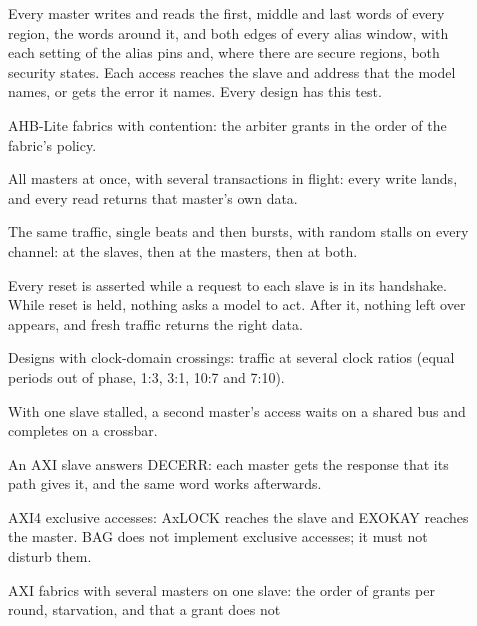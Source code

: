\begin{description}
\item[] Every master writes and reads the
  first, middle and last words of every region, the words around it, and both edges of
  every alias window, with each setting of the alias pins and, where there are secure
  regions, both security states. Each access reaches the slave and address that the
  model names, or gets the error it names. Every design has this test.
\item[] AHB-Lite fabrics with contention: the
  arbiter grants in the order of the fabric's policy.
\item[] All masters at once, with
  several transactions in flight: every write lands, and every read returns that
  master's own data.
\item[] The same traffic, single
  beats and then bursts, with random stalls on every channel: at the slaves, then at the
  masters, then at both.
\item[] Every reset is asserted while a
  request to each slave is in its handshake. While reset is held, nothing asks a model
  to act. After it, nothing left over appears, and fresh traffic returns the right data.
\item[] Designs with clock-domain
  crossings: traffic at several clock ratios (equal periods out of phase, 1:3, 3:1, 10:7
  and 7:10).
\item[] With one
  slave stalled, a second master's access waits on a shared bus and completes on a
  crossbar.
\item[] An AXI slave answers DECERR: each
  master gets the response that its path gives it, and the same word works afterwards.
\item[] AXI4 exclusive accesses:
  AxLOCK reaches the slave and EXOKAY reaches the master. BAG does not implement
  exclusive accesses; it must not disturb them.
\item[] AXI fabrics with several masters
  on one slave: the order of grants per round, starvation, and that a grant does not

\end{description}
